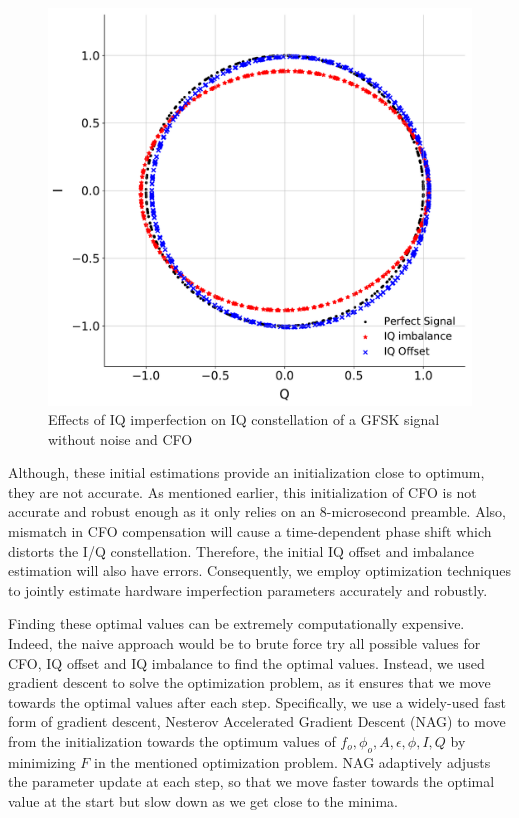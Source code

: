 \begin{figure}[t!]
    \centering
    \includegraphics[width = \linewidth]{plots/IQ_const.pdf} 
    \caption{Effects of IQ imperfection on IQ constellation of a GFSK signal without noise and CFO}
    \label{fig:iq_const}
\end{figure}
\fi

Although, these initial estimations provide an initialization close to optimum,
they are not accurate. 
%
As mentioned earlier, this initialization of CFO
is not accurate and robust enough as it only relies on an 8-microsecond
preamble. 
%
Also, mismatch in CFO compensation will cause a time-dependent phase
shift which distorts the I/Q constellation. 
%
Therefore, the initial IQ offset
and imbalance estimation will also have errors. 
%
Consequently, we employ
optimization techniques to jointly estimate hardware imperfection parameters
accurately and robustly. 
 
Finding these optimal values can be extremely computationally expensive. 
%
Indeed, the naive approach would be to brute force try all possible values for CFO, IQ offset and IQ imbalance to find the optimal values. 
%
Instead, we used gradient descent to solve the optimization problem, as it ensures that we move towards the optimal values after each step. 
%
Specifically, we use a widely-used fast form of gradient descent, Nesterov Accelerated Gradient Descent (NAG) to move from the initialization towards the optimum values
of $f_o,\phi_o,A,\epsilon,\phi,I,Q$ by minimizing $F$ in the mentioned
optimization problem. 
%
NAG adaptively adjusts the parameter update at each step, so that we move faster towards the optimal value at the start but slow down as we get close to the minima.


